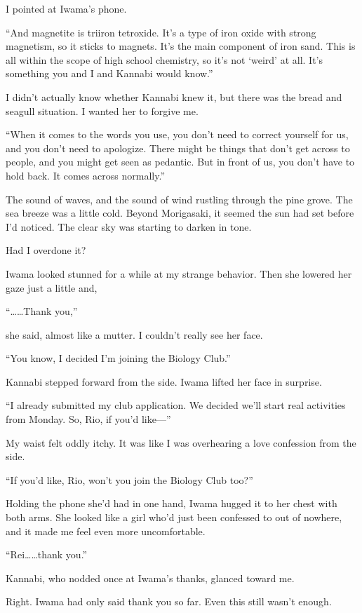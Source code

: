 \documentclass[
    a4paper,
    12pt,
    twoside,
    openany,
    UTF8,
    fontset=windows
]{ctexbook}
\begin{document}
I pointed at Iwama's phone.

``And magnetite is triiron tetroxide. It's a type of iron oxide with strong magnetism, so it sticks to magnets. It's the main component of iron sand. This is all within the scope of high school chemistry, so it's not `weird' at all. It's something you and I and Kannabi would know.''

I didn't actually know whether Kannabi knew it, but there was the bread and seagull situation. I wanted her to forgive me.

``When it comes to the words you use, you don't need to correct yourself for us, and you don't need to apologize. There might be things that don't get across to people, and you might get seen as pedantic. But in front of us, you don't have to hold back. It comes across normally.''

The sound of waves, and the sound of wind rustling through the pine grove. The sea breeze was a little cold. Beyond Morigasaki, it seemed the sun had set before I'd noticed. The clear sky was starting to darken in tone.

Had I overdone it?

Iwama looked stunned for a while at my strange behavior. Then she lowered her gaze just a little and,

``\dots\dots Thank you,''

she said, almost like a mutter. I couldn't really see her face.

``You know, I decided I'm joining the Biology Club.''

Kannabi stepped forward from the side. Iwama lifted her face in surprise.

``I already submitted my club application. We decided we'll start real activities from Monday. So, Rio, if you'd like---''

My waist felt oddly itchy. It was like I was overhearing a love confession from the side.

``If you'd like, Rio, won't you join the Biology Club too?''

Holding the phone she'd had in one hand, Iwama hugged it to her chest with both arms. She looked like a girl who'd just been confessed to out of nowhere, and it made me feel even more uncomfortable.

``Rei\dots\dots thank you.''

Kannabi, who nodded once at Iwama's thanks, glanced toward me.

Right. Iwama had only said thank you so far. Even this still wasn't enough.
\end{document}
